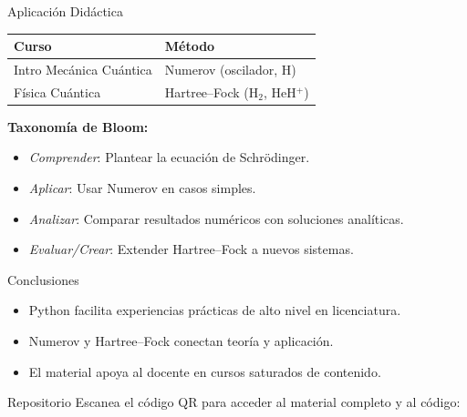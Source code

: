\documentclass[final]{beamer}
\begin{document}
\begin{frame}[t]
\begin{columns}[t,totalwidth=\textwidth]
\begin{column}{0.32\textwidth}
  \begin{block}{Aplicación Didáctica}
    \begin{tabular}{@{}ll@{}}
      \toprule
      Curso & Método \\
      \midrule
      Intro Mecánica Cuántica & Numerov (oscilador, H) \\
      Física Cuántica & Hartree–Fock (H$_2$, HeH$^+$) \\
      \bottomrule
    \end{tabular}

    \vspace{1em}
    \textbf{Taxonomía de Bloom:}
    \begin{itemize}
      \item \textit{Comprender}: Plantear la ecuación de Schrödinger.
      \item \textit{Aplicar}: Usar Numerov en casos simples.
      \item \textit{Analizar}: Comparar resultados numéricos con soluciones analíticas.
      \item \textit{Evaluar/Crear}: Extender Hartree–Fock a nuevos sistemas.
    \end{itemize}
  \end{block}

  \begin{block}{Conclusiones}
    \begin{itemize}
      \item Python facilita experiencias prácticas de alto nivel en licenciatura.
      \item Numerov y Hartree–Fock conectan teoría y aplicación.
      \item El material apoya al docente en cursos saturados de contenido.
    \end{itemize}
  \end{block}

  \begin{block}{Repositorio}
    Escanea el código QR para acceder al material completo y al código:
    \begin{center}
    \end{center}
  \end{block}
\end{column}

\end{columns}
\end{frame}
\end{document}
